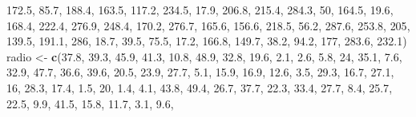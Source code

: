 \documentclass[]{book}
\newenvironment{Shaded}{\begin{snugshade}}{\end{snugshade}}
\newcommand{\KeywordTok}[1]{\textcolor[rgb]{0.13,0.29,0.53}{\textbf{#1}}}
\newcommand{\DecValTok}[1]{\textcolor[rgb]{0.00,0.00,0.81}{#1}}
\newcommand{\FloatTok}[1]{\textcolor[rgb]{0.00,0.00,0.81}{#1}}
\newcommand{\StringTok}[1]{\textcolor[rgb]{0.31,0.60,0.02}{#1}}
\newcommand{\NormalTok}[1]{#1}
\begin{document}
\begin{Shaded}
\begin{Highlighting}[]
    \FloatTok{172.5}\NormalTok{, }\FloatTok{85.7}\NormalTok{, }\FloatTok{188.4}\NormalTok{, }\FloatTok{163.5}\NormalTok{, }\FloatTok{117.2}\NormalTok{, }\FloatTok{234.5}\NormalTok{, }\FloatTok{17.9}\NormalTok{, }\FloatTok{206.8}\NormalTok{, }\FloatTok{215.4}\NormalTok{, }\FloatTok{284.3}\NormalTok{, }\DecValTok{50}\NormalTok{, }
    \FloatTok{164.5}\NormalTok{, }\FloatTok{19.6}\NormalTok{, }\FloatTok{168.4}\NormalTok{, }\FloatTok{222.4}\NormalTok{, }\FloatTok{276.9}\NormalTok{, }\FloatTok{248.4}\NormalTok{, }\FloatTok{170.2}\NormalTok{, }\FloatTok{276.7}\NormalTok{, }\FloatTok{165.6}\NormalTok{, }\FloatTok{156.6}\NormalTok{, }\FloatTok{218.5}\NormalTok{, }
    \FloatTok{56.2}\NormalTok{, }\FloatTok{287.6}\NormalTok{, }\FloatTok{253.8}\NormalTok{, }\DecValTok{205}\NormalTok{, }\FloatTok{139.5}\NormalTok{, }\FloatTok{191.1}\NormalTok{, }\DecValTok{286}\NormalTok{, }\FloatTok{18.7}\NormalTok{, }\FloatTok{39.5}\NormalTok{, }\FloatTok{75.5}\NormalTok{, }\FloatTok{17.2}\NormalTok{, }\FloatTok{166.8}\NormalTok{, }
    \FloatTok{149.7}\NormalTok{, }\FloatTok{38.2}\NormalTok{, }\FloatTok{94.2}\NormalTok{, }\DecValTok{177}\NormalTok{, }\FloatTok{283.6}\NormalTok{, }\FloatTok{232.1}\NormalTok{)}
\NormalTok{radio <-}\StringTok{ }\KeywordTok{c}\NormalTok{(}\FloatTok{37.8}\NormalTok{, }\FloatTok{39.3}\NormalTok{, }\FloatTok{45.9}\NormalTok{, }\FloatTok{41.3}\NormalTok{, }\FloatTok{10.8}\NormalTok{, }\FloatTok{48.9}\NormalTok{, }\FloatTok{32.8}\NormalTok{, }\FloatTok{19.6}\NormalTok{, }\FloatTok{2.1}\NormalTok{, }\FloatTok{2.6}\NormalTok{, }\FloatTok{5.8}\NormalTok{, }\DecValTok{24}\NormalTok{, }
    \FloatTok{35.1}\NormalTok{, }\FloatTok{7.6}\NormalTok{, }\FloatTok{32.9}\NormalTok{, }\FloatTok{47.7}\NormalTok{, }\FloatTok{36.6}\NormalTok{, }\FloatTok{39.6}\NormalTok{, }\FloatTok{20.5}\NormalTok{, }\FloatTok{23.9}\NormalTok{, }\FloatTok{27.7}\NormalTok{, }\FloatTok{5.1}\NormalTok{, }\FloatTok{15.9}\NormalTok{, }\FloatTok{16.9}\NormalTok{, }\FloatTok{12.6}\NormalTok{, }
    \FloatTok{3.5}\NormalTok{, }\FloatTok{29.3}\NormalTok{, }\FloatTok{16.7}\NormalTok{, }\FloatTok{27.1}\NormalTok{, }\DecValTok{16}\NormalTok{, }\FloatTok{28.3}\NormalTok{, }\FloatTok{17.4}\NormalTok{, }\FloatTok{1.5}\NormalTok{, }\DecValTok{20}\NormalTok{, }\FloatTok{1.4}\NormalTok{, }\FloatTok{4.1}\NormalTok{, }\FloatTok{43.8}\NormalTok{, }\FloatTok{49.4}\NormalTok{, }\FloatTok{26.7}\NormalTok{, }
    \FloatTok{37.7}\NormalTok{, }\FloatTok{22.3}\NormalTok{, }\FloatTok{33.4}\NormalTok{, }\FloatTok{27.7}\NormalTok{, }\FloatTok{8.4}\NormalTok{, }\FloatTok{25.7}\NormalTok{, }\FloatTok{22.5}\NormalTok{, }\FloatTok{9.9}\NormalTok{, }\FloatTok{41.5}\NormalTok{, }\FloatTok{15.8}\NormalTok{, }\FloatTok{11.7}\NormalTok{, }\FloatTok{3.1}\NormalTok{, }\FloatTok{9.6}\NormalTok{, }

\end{Highlighting}
\end{Shaded}
\end{document}
